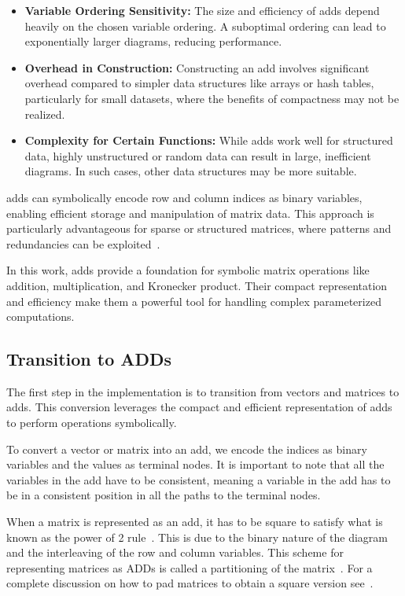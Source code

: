 \begin{itemize}
    \item \textbf{Variable Ordering Sensitivity:} The size and efficiency of \glspl{add} depend heavily on the chosen variable ordering.
    A suboptimal ordering can lead to exponentially larger diagrams, reducing performance.
    \item \textbf{Overhead in Construction:} Constructing an \gls{add} involves significant overhead compared to simpler data structures like arrays or hash tables, particularly for small datasets, where the benefits of compactness may not be realized.
    \item \textbf{Complexity for Certain Functions:} While \glspl{add} work well for structured data, highly unstructured or random data can result in large, inefficient diagrams.
    In such cases, other data structures may be more suitable.
\end{itemize}

\glspl{add} can symbolically encode row and column indices as binary variables, enabling efficient storage and manipulation of matrix data.
This approach is particularly advantageous for sparse or structured matrices, where patterns and redundancies can be exploited~\cite{bahar1997algebric}.

In this work, \glspl{add} provide a foundation for symbolic matrix operations like addition, multiplication, and Kronecker product.
Their compact representation and efficiency make them a powerful tool for handling complex parameterized computations.

\subsection{Transition to ADDs}\label{subsec:transition-to-adds}
The first step in the implementation is to transition from vectors and matrices to \glspl{add}.
This conversion leverages the compact and efficient representation of \glspl{add} to perform operations symbolically.

To convert a vector or matrix into an \gls{add}, we encode the indices as binary variables and the values as terminal nodes.
It is important to note that all the variables in the \gls{add} have to be consistent, meaning a variable in the \gls{add} has to be in a consistent position in all the paths to the terminal nodes.

When a matrix is represented as an \gls{add}, it has to be square to satisfy what is known as the power of 2 rule~\cite{bahar1997algebric}.
This is due to the binary nature of the diagram and the interleaving of the row and column variables.
This scheme for representing matrices as ADDs is called a partitioning of the matrix~\cite{bahar1997algebric}.
For a complete discussion on how to pad matrices to obtain a square version see~\cite{bahar1997algebric}.

